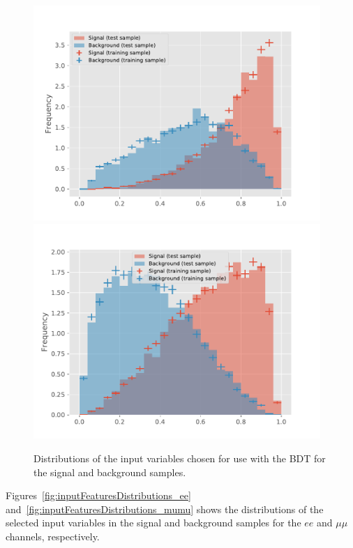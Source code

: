 \begin{figure}[htbp]
\centering
\includegraphics[width=0.97\textwidth]{figs/background-estimation/plots/response_ee.pdf}
\\
\includegraphics[width=0.97\textwidth]{figs/background-estimation/plots/response_mumu.pdf}
\caption{
Distributions of the input variables chosen for use with the BDT for the signal and background samples.}
\label{fig:bdtResponse}
\end{figure}

Figures~\ref{fig:inputFeaturesDistributions_ee} and~\ref{fig:inputFeaturesDistributions_mumu} shows the distributions of the selected input variables in the signal and background samples for the $ee$ and $\mu\mu$ channels, respectively.

